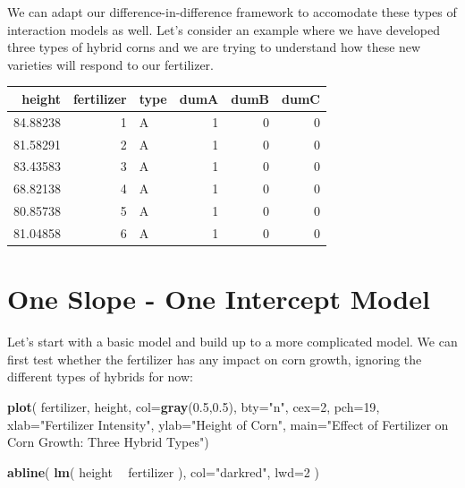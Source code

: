 \documentclass[]{book}
\newenvironment{Shaded}{\begin{snugshade}}{\end{snugshade}}
\newcommand{\DataTypeTok}[1]{\textcolor[rgb]{0.13,0.29,0.53}{#1}}
\newcommand{\DecValTok}[1]{\textcolor[rgb]{0.00,0.00,0.81}{#1}}
\newcommand{\FloatTok}[1]{\textcolor[rgb]{0.00,0.00,0.81}{#1}}
\newcommand{\KeywordTok}[1]{\textcolor[rgb]{0.13,0.29,0.53}{\textbf{#1}}}
\newcommand{\NormalTok}[1]{#1}
\newcommand{\OperatorTok}[1]{\textcolor[rgb]{0.81,0.36,0.00}{\textbf{#1}}}
\newcommand{\StringTok}[1]{\textcolor[rgb]{0.31,0.60,0.02}{#1}}
\theoremstyle{definition}
\theoremstyle{definition}
\theoremstyle{definition}
\theoremstyle{remark}
\begin{document}
We can adapt our difference-in-difference framework to accomodate these
types of interaction models as well. Let's consider an example where we
have developed three types of hybrid corns and we are trying to
understand how these new varieties will respond to our fertilizer.

\begin{tabular}{r|r|l|r|r|r}
\hline
height & fertilizer & type & dumA & dumB & dumC\\
\hline
84.88238 & 1 & A & 1 & 0 & 0\\
\hline
81.58291 & 2 & A & 1 & 0 & 0\\
\hline
83.43583 & 3 & A & 1 & 0 & 0\\
\hline
68.82138 & 4 & A & 1 & 0 & 0\\
\hline
80.85738 & 5 & A & 1 & 0 & 0\\
\hline
81.04858 & 6 & A & 1 & 0 & 0\\
\hline
\end{tabular}

\hypertarget{one-slope---one-intercept-model}{%
\section{One Slope - One Intercept
Model}\label{one-slope---one-intercept-model}}

Let's start with a basic model and build up to a more complicated model.
We can first test whether the fertilizer has any impact on corn growth,
ignoring the different types of hybrids for now:

\begin{Shaded}
\begin{Highlighting}[]


\KeywordTok{plot}\NormalTok{( fertilizer, height, }\DataTypeTok{col=}\KeywordTok{gray}\NormalTok{(}\FloatTok{0.5}\NormalTok{,}\FloatTok{0.5}\NormalTok{), }\DataTypeTok{bty=}\StringTok{"n"}\NormalTok{, }\DataTypeTok{cex=}\DecValTok{2}\NormalTok{, }\DataTypeTok{pch=}\DecValTok{19}\NormalTok{,}
      \DataTypeTok{xlab=}\StringTok{"Fertilizer Intensity"}\NormalTok{, }\DataTypeTok{ylab=}\StringTok{"Height of Corn"}\NormalTok{, }
      \DataTypeTok{main=}\StringTok{"Effect of Fertilizer on Corn Growth: Three Hybrid Types"}\NormalTok{)}

\KeywordTok{abline}\NormalTok{( }\KeywordTok{lm}\NormalTok{( height }\OperatorTok{~}\StringTok{ }\NormalTok{fertilizer ), }\DataTypeTok{col=}\StringTok{"darkred"}\NormalTok{, }\DataTypeTok{lwd=}\DecValTok{2}\NormalTok{ )}
\end{Highlighting}
\end{Shaded}
\end{document}
